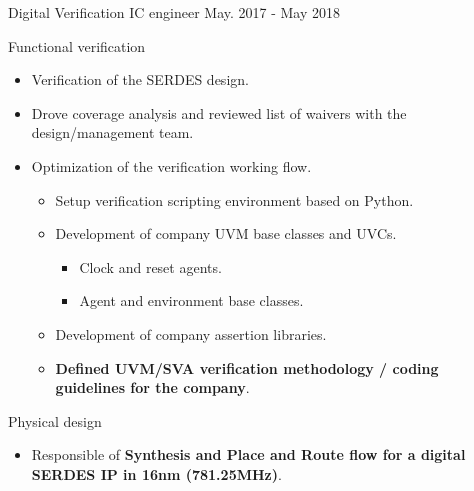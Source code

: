 \begin{cventries}
  \cventry
    {Digital Verification IC engineer} %
    {} %
    {} %
    {May. 2017 - May 2018} %
    {
      \begin{cvitems} %
        \item {Functional verification}
        \begin{itemize}
          \item {Verification of the SERDES design.}
          \item {Drove coverage analysis and reviewed list of waivers with the design/management team.}
          \item {Optimization of the verification working flow.}
          \begin{itemize}
            \item {Setup verification scripting environment based on Python.}
            \item {Development of company UVM base classes and UVCs.}
              \begin{itemize}
                \item {Clock and reset agents.}
                \item {Agent and environment base classes.}
              \end{itemize}
            \item {Development of company assertion libraries.}
            \item {\textbf{Defined UVM/SVA verification methodology / coding guidelines for the company}.}
          \end{itemize}
        \end{itemize}
        \item {Physical design}
        \begin{itemize}
          \item {Responsible of \textbf{Synthesis and Place and Route flow for a digital SERDES IP in 16nm (781.25MHz)}.}

\end{itemize}
\end{cvitems}}
\end{cventries}
